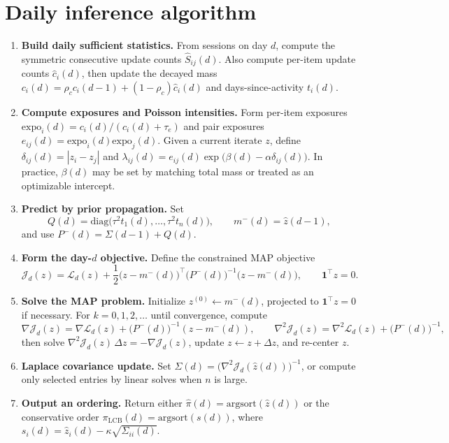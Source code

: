 \documentclass[11pt]{article}
\begin{document}
\section{Daily inference algorithm}
\label{app:daily_inference}
\begin{algorithm}[tbp]
\centering
\caption{Daily MAP + Laplace update for dynamic latent order inference}
\label{alg:daily_inference}
\begin{enumerate}
\item \textbf{Build daily sufficient statistics.}
From sessions on day $d$, compute the symmetric consecutive update counts $\widehat S_{ij}(d)$.
Also compute per-item update counts $\widehat c_i(d)$, then update the decayed mass
$c_i(d)=\rho_c c_i(d-1)+(1-\rho_c)\widehat c_i(d)$ and days-since-activity $t_i(d)$.

\item \textbf{Compute exposures and Poisson intensities.}
Form per-item exposures $\mathrm{expo}_i(d)=c_i(d)/(c_i(d)+\tau_e)$ and pair exposures
$e_{ij}(d)=\mathrm{expo}_i(d)\mathrm{expo}_j(d)$.
Given a current iterate $z$, define $\delta_{ij}(d)=|z_i-z_j|$ and
$\lambda_{ij}(d)=e_{ij}(d)\exp\big(\beta(d)-\alpha\delta_{ij}(d)\big)$.
In practice, $\beta(d)$ may be set by matching total mass or treated as an optimizable intercept.

\item \textbf{Predict by prior propagation.}
Set
\[
Q(d)=\mathrm{diag}\big(\tau^2 t_1(d),\dots,\tau^2 t_n(d)\big),
\qquad
m^-(d)=\widehat z(d-1),
\]
and use $P^-(d)=\Sigma(d-1)+Q(d)$.

\item \textbf{Form the day-$d$ objective.}
Define the constrained MAP objective
\[
\mathcal J_d(z)=\mathcal L_d(z)+\frac12\big(z-m^-(d)\big)^\top\big(P^-(d)\big)^{-1}\big(z-m^-(d)\big),
\qquad \mathbf 1^\top z=0.
\]

\item \textbf{Solve the MAP problem.}
Initialize $z^{(0)}\leftarrow m^-(d)$, projected to $\mathbf 1^\top z=0$ if necessary.
For $k=0,1,2,\dots$ until convergence, compute
\[
\nabla\mathcal J_d(z)=\nabla\mathcal L_d(z)+\big(P^-(d)\big)^{-1}(z-m^-(d)),
\qquad
\nabla^2\mathcal J_d(z)=\nabla^2\mathcal L_d(z)+\big(P^-(d)\big)^{-1},
\]
then solve $\nabla^2\mathcal J_d(z)\,\Delta z=-\nabla\mathcal J_d(z)$, update $z\leftarrow z+\Delta z$, and re-center $z$.

\item \textbf{Laplace covariance update.}
Set $\Sigma(d)=\big(\nabla^2\mathcal J_d(\widehat z(d))\big)^{-1}$, or compute only selected entries by linear solves when $n$ is large.

\item \textbf{Output an ordering.}
Return either $\widehat\pi(d)=\mathrm{argsort}(\widehat z(d))$ or the conservative order
$\pi_{\mathrm{LCB}}(d)=\mathrm{argsort}(s(d))$, where $s_i(d)=\widehat z_i(d)-\kappa\sqrt{\Sigma_{ii}(d)}$.
\end{enumerate}
\end{algorithm}
\end{document}
